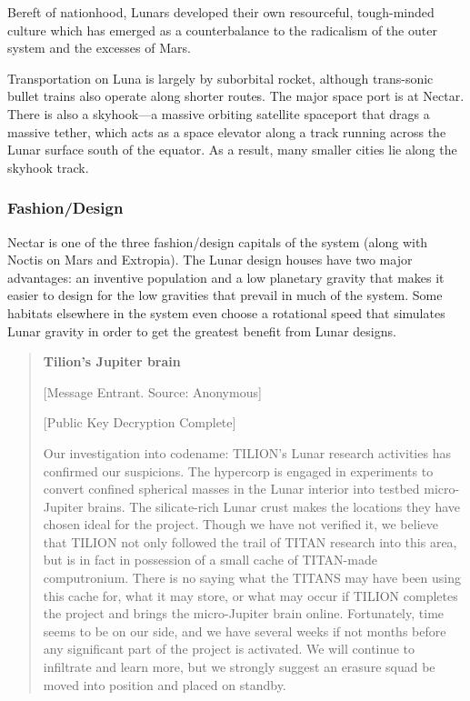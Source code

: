 Bereft of nationhood, Lunars developed their own resourceful, tough-minded culture which has emerged as a counterbalance to the radicalism of the outer system and the excesses of Mars. 

Transportation on Luna is largely by suborbital rocket, although trans-sonic bullet trains also operate along shorter routes. The major space port is at Nectar. There is also a skyhook—a massive orbiting satellite spaceport that drags a massive tether, which acts as a space elevator along a track running across the Lunar surface south of the equator. As a result, many smaller cities lie along the skyhook track. 

\subsubsection{Fashion/Design} \label{sec:fashiondesign} 

Nectar is one of the three fashion/design capitals of the system (along with Noctis on Mars and Extropia). The Lunar design houses have two major advantages: an inventive population and a low planetary gravity that makes it easier to design for the low gravities that prevail in much of the system. Some habitats elsewhere in the system even choose a rotational speed that simulates Lunar gravity in order to get the greatest benefit from Lunar designs. 

\begin{quotation} \textbf{Tilion's Jupiter brain} 

[Message Entrant. Source: Anonymous] 

[Public Key Decryption Complete] 

Our investigation into codename: TILION's Lunar research activities has confirmed our suspicions. The hypercorp is engaged in experiments to convert confined spherical masses in the Lunar interior into testbed micro-Jupiter brains. The silicate-rich Lunar crust makes the locations they have chosen ideal for the project. Though we have not verified it, we believe that TILION not only followed the trail of TITAN research into this area, but is in fact in possession of a small cache of TITAN-made computronium. There is no saying what the TITANS may have been using this cache for, what it may store, or what may occur if TILION completes the project and brings the micro-Jupiter brain online. Fortunately, time seems to be on our side, and we have several weeks if not months before any significant part of the project is activated. We will continue to infiltrate and learn more, but we strongly suggest an erasure squad be moved into position and placed on standby. \end{quotation} 


